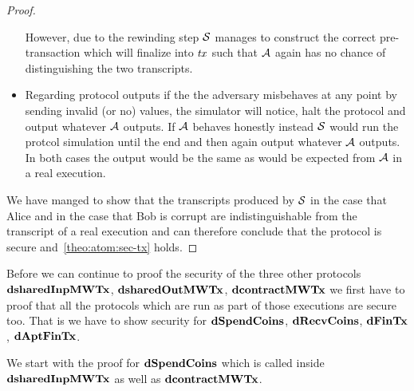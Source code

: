 \begin{proof}
\begin{itemize}
        However, due to the rewinding step $\mathcal{S}$ manages to construct the correct pre-transaction which will finalize into $\mathit{tx}$ such that $\mathcal{A}$ again has no chance of distinguishing the two transcripts.
        \item Regarding protocol outputs if the the adversary misbehaves at any point by sending invalid (or no) values, the simulator will notice, halt the protocol and output whatever $\mathcal{A}$ outputs.
        If $\mathcal{A}$ behaves honestly instead $\mathcal{S}$ would run the protcol simulation until the end and then again output whatever $\mathcal{A}$ outputs.
        In both cases the output would be the same as would be expected from $\mathcal{A}$ in a real execution.
    \end{itemize}

    We have manged to show that the transcripts produced by $\mathcal{S}$ in the case that Alice and in the case that Bob is corrupt are indistinguishable from the transcript of a real execution and can therefore conclude that the protocol is secure and~\cref{theo:atom:sec-tx} holds.

\end{proof}

Before we can continue to proof the security of the three other protocols \\$\mathbf{dsharedInpMWTx}$, $\mathbf{dsharedOutMWTx}$, $\mathbf{dcontractMWTx}$ we first have to proof that all the protocols which are run as part of those executions are secure too.
That is we have to show security for $\mathbf{dSpendCoins}$, $\mathbf{dRecvCoins}$, $\mathbf{dFinTx}$, $\mathbf{dAptFinTx}$.

We start with the proof for $\mathbf{dSpendCoins}$ which is called inside $\mathbf{dsharedInpMWTx}$ as well as $\mathbf{dcontractMWTx}$.


